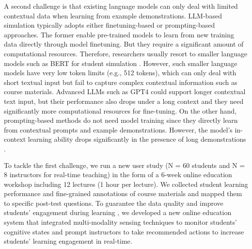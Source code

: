 A second challenge is that existing language models can only deal with limited contextual data when learning from example demonstrations. LLM-based simulation typically adopts either finetuning-based or prompting-based approaches. The former \cite{lee2024language} enable pre-trained models to learn from new training data directly through model finetuning. But they require a significant amount of computational resources. Therefore, researchers usually resort to smaller language models such as BERT for student simulation \cite{li2024integrating,lee2024monacobert,lee2024language}. However, such smaller language models have very low token limits (e.g., 512 tokens), which can only deal with short textual input but fail to capture complex contextual information such as course materials. Advanced LLMs such as GPT4 could support longer contextual text input, but their performance also drops under a long context \cite{li2024long} and they need significantly more computational resources for fine-tuning.
On the other hand, prompting-based methods \cite{li2024explainable} do not need model training since they directly learn from contextual prompts and example demonstrations. However, the model's in-context learning ability drops significantly in the presence of long demonstrations \cite{li2024long}.   




To tackle the first challenge, we run a new user study (N = 60 students and N = 8 instructors for real-time teaching) in the form of a 6-week online education workshop including 12 lectures (1 hour per lecture). We collected student learning performance and fine-grained annotations of course materials and mapped them to specific post-test questions. To guarantee the data quality and improve students' engagement during learning \cite{wang2019effects}, we developed a new online education system that integrated multi-modality sensing techniques to monitor students' cognitive states and prompt instructors to take recommended actions to increase students' learning engagement in real-time.




